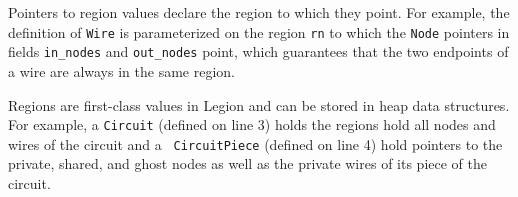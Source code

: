Pointers to region values declare the region to which they point.  For
example, the definition of {\tt Wire} is parameterized on the region
{\tt rn} to which the {\tt Node} pointers in fields {\tt in\_nodes}
and {\tt out\_nodes} point, which guarantees that the two endpoints of
a wire are always in the same region.

Regions are first-class values in Legion and can be stored in heap
data structures.  For example, a {\tt Circuit} (defined on line 3)
holds the regions hold all nodes and wires of the circuit and a {\tt
  CircuitPiece} (defined on line 4) hold pointers to the private,
shared, and ghost nodes as well as the private wires of its piece of
the circuit.





%

%
%
